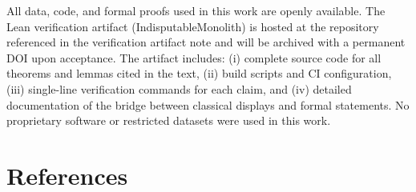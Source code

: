 \documentclass[12pt,a4paper]{article}
\begin{document}
All data, code, and formal proofs used in this work are openly available. The Lean verification artifact (IndisputableMonolith) is hosted at the repository referenced in the verification artifact note and will be archived with a permanent DOI upon acceptance. The artifact includes: (i) complete source code for all theorems and lemmas cited in the text, (ii) build scripts and CI configuration, (iii) single-line verification commands for each claim, and (iv) detailed documentation of the bridge between classical displays and formal statements. No proprietary software or restricted datasets were used in this work.

\section*{References}
\end{document}
